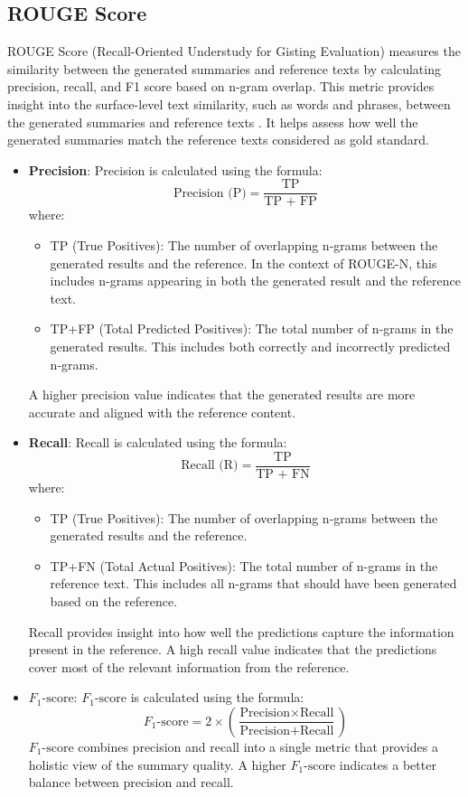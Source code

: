 \documentclass[runningheads]{llncs}
\begin{document}
\subsection{ROUGE Score}
ROUGE Score (Recall-Oriented Understudy for Gisting Evaluation) measures the similarity between the generated summaries and reference texts by calculating precision, recall, and F1 score based on n-gram overlap. This metric provides insight into the surface-level text similarity, such as words and phrases, between the generated summaries and reference texts \cite{Lin2004}. It helps assess how well the generated summaries match the reference texts considered as gold standard.
\begin{itemize}
    \item \textbf{Precision}: Precision is calculated using the formula:
    \[
    \text{Precision (P)} = \frac{\text{TP}}{\text{TP + FP}}
    \]
    where:
    \begin{itemize}
        \item TP (True Positives): The number of overlapping n-grams between the generated results and the reference. In the context of ROUGE-N, this includes n-grams appearing in both the generated result and the reference text.
        \item TP+FP (Total Predicted Positives): The total number of n-grams in the generated results. This includes both correctly and incorrectly predicted n-grams.
    \end{itemize}
    A higher precision value indicates that the generated results are more accurate and aligned with the reference content.

    \item \textbf{Recall}: Recall is calculated using the formula:
    \[
    \text{Recall (R)} = \frac{\text{TP}}{\text{TP + FN}}
    \]
    where:
    \begin{itemize}
        \item TP (True Positives): The number of overlapping n-grams between the generated results and the reference.
        \item TP+FN (Total Actual Positives): The total number of n-grams in the reference text. This includes all n-grams that should have been generated based on the reference.
    \end{itemize}
    Recall provides insight into how well the predictions capture the information present in the reference. A high recall value indicates that the predictions cover most of the relevant information from the reference.

    \item \textbf{\( F_{1}\text{-score} \)}: 
    \( F_{1}\text{-score} \) is calculated using the formula:
    \[
    F_{1}\text{-score} = 2 \times \left( \frac{\text{Precision} \times \text{Recall}}{\text{Precision} + \text{Recall}} \right)
    \]
    \( F_{1}\text{-score} \) combines precision and recall into a single metric that provides a holistic view of the summary quality. A higher \( F_{1}\text{-score} \) indicates a better balance between precision and recall.
\end{itemize}
    
\end{document}
